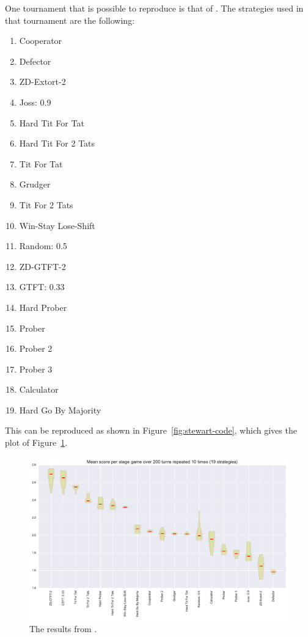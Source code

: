 \documentclass{jors}
\begin{document}
One tournament that is possible to reproduce is that of
\cite{Stewart2012}. The strategies used in that tournament are the following:

\begin{multicols}{2}
    \begin{enumerate}[noitemsep,topsep=0pt]
        \item Cooperator
        \item Defector
        \item ZD-Extort-2
        \item Joss: 0.9
        \item Hard Tit For Tat
        \item Hard Tit For 2 Tats
        \item Tit For Tat
        \item Grudger
        \item Tit For 2 Tats
        \item Win-Stay Lose-Shift
        \item Random: 0.5
        \item ZD-GTFT-2
        \item GTFT: 0.33
        \item Hard Prober
        \item Prober
        \item Prober 2
        \item Prober 3
        \item Calculator
        \item Hard Go By Majority
    \end{enumerate}
\end{multicols}

This can be reproduced as shown in Figure~\ref{fig:stewart-code}, which gives
the plot of Figure~\ref{fig:stewart_tournament}.

\begin{figure}[!hbtp]
	\centering
	\includegraphics[width=.75\textwidth]{stewart_tournament.pdf}
	\caption{The results from \cite{Stewart2012}.}
	\label{fig:stewart_tournament}
\end{figure}
\end{document}
